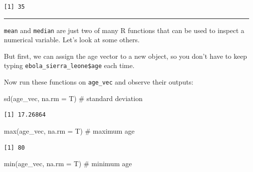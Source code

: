 \documentclass[
  letterpaper,
  DIV=11,
  numbers=noendperiod]{scrreprt}
\newenvironment{Shaded}{\begin{snugshade}}{\end{snugshade}}
\newcommand{\AttributeTok}[1]{\textcolor[rgb]{0.40,0.45,0.13}{#1}}
\newcommand{\CommentTok}[1]{\textcolor[rgb]{0.37,0.37,0.37}{#1}}
\newcommand{\FunctionTok}[1]{\textcolor[rgb]{0.28,0.35,0.67}{#1}}
\newcommand{\NormalTok}[1]{\textcolor[rgb]{0.00,0.23,0.31}{#1}}
\newcommand{\OtherTok}[1]{\textcolor[rgb]{0.00,0.23,0.31}{#1}}
\newcommand{\SpecialCharTok}[1]{\textcolor[rgb]{0.37,0.37,0.37}{#1}}
\begin{document}
\begin{verbatim}
[1] 35
\end{verbatim}

\begin{center}\rule{0.5\linewidth}{0.5pt}\end{center}

\texttt{mean} and \texttt{median} are just two of many R functions that
can be used to inspect a numerical variable. Let's look at some others.

But first, we can assign the age vector to a new object, so you don't
have to keep typing \texttt{ebola\_sierra\_leone\$age} each time.

\begin{Shaded}
\end{Shaded}

Now run these functions on \texttt{age\_vec} and observe their outputs:

\begin{Shaded}
\begin{Highlighting}[]
\FunctionTok{sd}\NormalTok{(age\_vec, }\AttributeTok{na.rm =}\NormalTok{ T) }\CommentTok{\# standard deviation}
\end{Highlighting}
\end{Shaded}

\begin{verbatim}
[1] 17.26864
\end{verbatim}

\begin{Shaded}
\begin{Highlighting}[]
\FunctionTok{max}\NormalTok{(age\_vec, }\AttributeTok{na.rm =}\NormalTok{ T) }\CommentTok{\# maximum age}
\end{Highlighting}
\end{Shaded}

\begin{verbatim}
[1] 80
\end{verbatim}

\begin{Shaded}
\begin{Highlighting}[]
\FunctionTok{min}\NormalTok{(age\_vec, }\AttributeTok{na.rm =}\NormalTok{ T) }\CommentTok{\# minimum age}
\end{Highlighting}
\end{Shaded}
\end{document}

